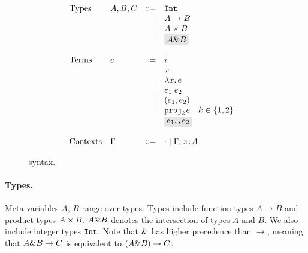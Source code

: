 \begin{figure}[t]
  \[
    \begin{array}{l}
      \begin{array}{llrll}
        \text{Types}
        & A, B, C & \Coloneqq & \code{Int} & \\
        &         & \mid      & A \to B   & \\
        &         & \mid      & \tpair A B & \\
        &         & \mid      & \highlight{$A \inter B$}  & \\

        \\
        \text{Terms}
        & e & \Coloneqq & i                      & \\
        &   & \mid & x                           & \\
        &   & \mid & \lamty x A e                & \\
        &   & \mid & \app {e_1} {e_2}            & \\
        &   & \mid & \pair {e_1} {e_2}           & \\
        &   & \mid & \proj k e \quad k \in \{ 1 , 2 \} & \\
        &   & \mid & \highlight{$e_1 \mergeop e_2$}  & \\

        \\
        \text{Contexts}
        & \Gamma & \Coloneqq & \cdot
                   \mid \Gamma, x \oftype A  & \\
      \end{array}
    \end{array}
  \]

  \caption{\name syntax.}
  \label{fig:fi-syntax}
\end{figure}

\paragraph{Types.} Meta-variables $A$, $B$ range over types. Types include
function types $A \to B$ and product types $A \times B$. 
$A \& B$ denotes the intersection of types $A$ and
$B$. We also include integer types $\texttt{Int}$.
Note that $\&$ has higher precedence than $\to$, meaning that
$A \& B \to C$ is equivalent to $(A \& B) \to C$.


